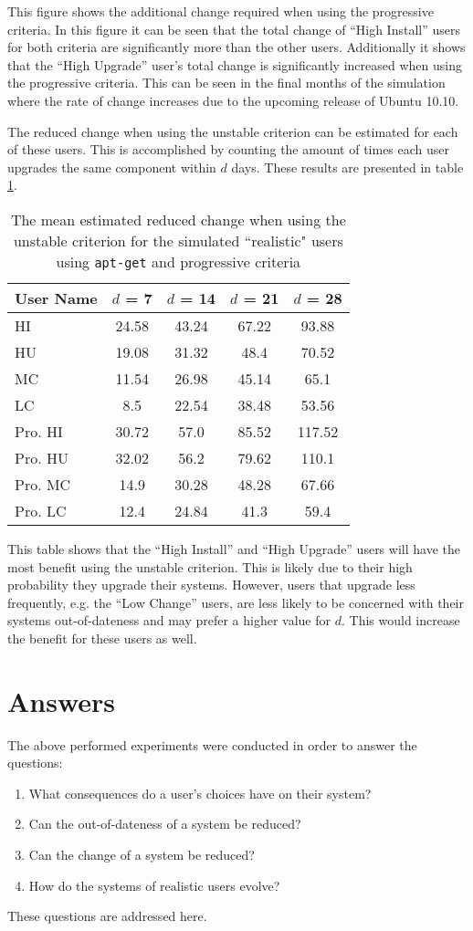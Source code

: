 This figure shows the additional change required when using the progressive criteria.
In this figure it can be seen that the total change of  ``High Install'' users for both criteria are significantly more than the other users.
Additionally it shows that the ``High Upgrade'' user's total change is significantly increased when using the progressive criteria.
This can be seen in the final months of the simulation where the rate of change increases due to the upcoming release of Ubuntu 10.10.

The reduced change when using the unstable criterion can be estimated for each of these users.
This is accomplished by counting the amount of times each user upgrades the same component within $d$ days.
These results are presented in table \ref{exp.tblq6sv}.
\begin{table}[h!]
\centering
\begin{tabular}{|l | c | c | c | c |}
\hline
User Name 	& $d$ = 7 	&  $d$ = 14 	&	$d$ = 21 	&	$d$ = 28 	\\ \hline
HI 			&24.58 	&	43.24&	 67.22&	 93.88\\
HU 			&19.08 	&	31.32&	 48.4&	 70.52\\
MC 			&11.54 	&	26.98&	 45.14&	 65.1\\
LC 			&8.5 	&	22.54&	 38.48&	 53.56\\
Pro. HI 	&30.72 	&	57.0&	 85.52&	 117.52\\
Pro. HU 	&32.02 	&	56.2&	 79.62&	 110.1\\
Pro. MC 	&14.9 	&	30.28&	 48.28&	 67.66\\
Pro. LC 	&12.4 	&	24.84&	 41.3&	 59.4\\ \hline
\end{tabular}
\caption{The mean estimated reduced change when using the unstable criterion for the simulated ``realistic" users using \texttt{apt-get} and progressive criteria}
\label{exp.tblq6sv}
\end{table}

This table shows that the ``High Install'' and ``High Upgrade'' users will have the most benefit using the unstable criterion.
This is likely due to their high probability they upgrade their systems.
However, users that upgrade less frequently, e.g. the ``Low Change'' users, are less likely to be concerned with their systems out-of-dateness and may prefer a higher value for $d$.
This would increase the benefit for these users as well.

\section{Answers}
The above performed experiments were conducted in order to answer the questions:
\begin{enumerate}
  \item What consequences do a user's choices have on their system?
  \item Can the out-of-dateness of a system be reduced?
  \item Can the change of a system be reduced?
  \item How do the systems of realistic users evolve?
\end{enumerate}
These questions are addressed here.


